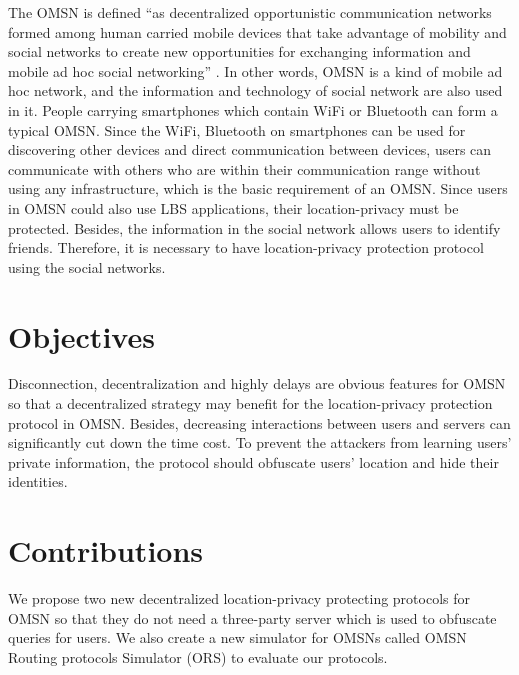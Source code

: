 The OMSN is defined ``as decentralized opportunistic communication networks formed among human carried mobile devices that take advantage of mobility and social networks to create new opportunities for exchanging information and mobile ad hoc social networking'' \cite {C2}. In other words, OMSN is a kind of mobile ad hoc network, and the information and technology of social network are also used in it. People carrying smartphones which contain WiFi or Bluetooth can form a typical OMSN. Since the WiFi, Bluetooth on smartphones can be used for discovering other devices and direct communication between devices, users can communicate with others who are within their communication range without using any infrastructure, which is the basic requirement of an OMSN. Since users in OMSN could also use LBS applications, their location-privacy must be protected. Besides, the information in the social network allows users to identify friends. Therefore, it is necessary to have location-privacy protection protocol using the social networks.


\section{Objectives}

Disconnection, decentralization and highly delays are obvious features for OMSN so that a decentralized strategy may benefit for the location-privacy protection protocol in OMSN. Besides, decreasing interactions between users and servers can significantly cut down the time cost. To prevent the attackers from learning users' private information, the protocol should obfuscate users' location and hide their identities.


\section{Contributions}

We propose two new decentralized location-privacy protecting protocols for OMSN so that they do not need a three-party server which is used to obfuscate queries for users. We also create a new simulator for OMSNs called OMSN Routing protocols Simulator (ORS) to evaluate our protocols.

